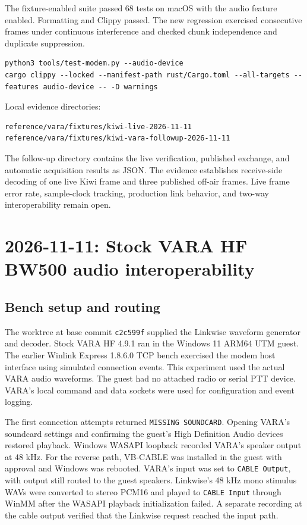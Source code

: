 \documentclass[11pt,a4paper]{article}
\newcommand{\pathtext}[1]{\path{#1}}
\begin{document}
The fixture-enabled suite passed 68 tests on macOS with the audio
feature enabled. Formatting and Clippy passed. The new regression
exercised consecutive frames under continuous interference and checked
chunk independence and duplicate suppression.

\begin{lstlisting}
python3 tools/test-modem.py --audio-device
cargo clippy --locked --manifest-path rust/Cargo.toml --all-targets --features audio-device -- -D warnings
\end{lstlisting}

Local evidence directories:
\begin{lstlisting}
reference/vara/fixtures/kiwi-live-2026-11-11
reference/vara/fixtures/kiwi-vara-followup-2026-11-11
\end{lstlisting}
The follow-up directory contains the live verification, published
exchange, and automatic acquisition results as JSON.
The evidence establishes receive-side decoding of one live Kiwi frame
and three published off-air frames. Live frame error rate, sample-clock
tracking, production link behavior, and two-way interoperability remain
open.


\section{2026-11-11: Stock VARA HF BW500 audio interoperability}

\subsection{Bench setup and routing}

The \pathtext{productize} worktree at base commit \texttt{c2c599f} supplied
the Linkwise waveform generator and decoder. Stock VARA HF 4.9.1 ran in the
Windows 11 ARM64 UTM guest. The earlier Winlink Express 1.8.6.0 TCP bench
exercised the modem host interface using simulated connection events.
This experiment used the actual VARA audio waveforms. The guest had no
attached radio or serial PTT device. VARA's local command and data sockets
were used for configuration and event logging.

The first connection attempts returned \texttt{MISSING SOUNDCARD}.
Opening VARA's soundcard settings and confirming the guest's High Definition
Audio devices restored playback. Windows WASAPI loopback recorded VARA's
speaker output at 48 kHz. For the reverse path, VB-CABLE was installed in the
guest with approval and Windows was rebooted. VARA's input was set to
\texttt{CABLE Output}, with output still routed to the guest speakers.
Linkwise's 48 kHz mono stimulus WAVs were converted to stereo PCM16 and
played to \texttt{CABLE Input} through WinMM after the WASAPI playback
initialization failed. A separate recording at the cable output verified
that the Linkwise request reached the input path.
\end{document}
